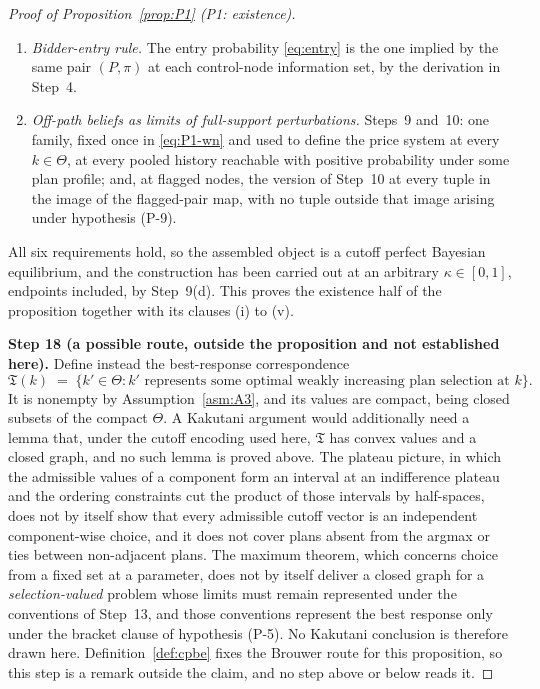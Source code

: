 \documentclass[11pt]{article}
\newcommand{\Eop}{\mathbb{E}}
\newcommand{\Tmap}{\mathcal{T}}
\begin{document}
\begin{proof}[Proof of Proposition~\ref{prop:P1} (P1: existence)]
\begin{enumerate}[label=(\roman*),leftmargin=2.4em,itemsep=3pt]
  pooled family and Step~6 for the measurable flagged family, both solving
  $P(\mathcal I) = \Eop[Y \mid \mathcal I]$ by Step~4, at the beliefs of (iii) where the history
  carries positive probability under $k^\star$, and at Step~9(b)'s limit belief at the reachable
  histories that do not, since those are the histories the deviation payoffs defining $\Tmap$ read.
  At unreachable histories the requirement asks nothing and Step~9(c)'s convention supplies a value
  that is itself an inner root.
\item \emph{Bidder-entry rule.} The entry probability \eqref{eq:entry} is the one implied by the same
  pair $(P,\pi)$ at each control-node information set, by the derivation in Step~4.
\item \emph{Off-path beliefs as limits of full-support perturbations.} Steps~9 and~10: one family,
  fixed once in \eqref{eq:P1-wn} and used to define the price system at every $k \in \Theta$, at
  every pooled history reachable with positive probability under some plan profile; and, at flagged
  nodes, the version of Step~10 at every tuple in the image of the flagged-pair map, with no tuple
  outside that image arising under hypothesis (P-9).
\end{enumerate}

All six requirements hold, so the assembled object is a cutoff perfect Bayesian equilibrium, and the
construction has been carried out at an arbitrary $\kappa \in [0,1]$, endpoints included, by
Step~9(d). This proves the existence half of the proposition together with its clauses (i) to (v).

\smallskip
\noindent\textbf{Step 18 (a possible route, outside the proposition and not established here).}
Define instead the best-response correspondence
\[
\mathfrak T(k) \;=\; \bigl\{k' \in \Theta : k' \text{ represents some optimal weakly increasing plan
selection at } k\bigr\}.
\]
It is nonempty by Assumption~\ref{asm:A3}, and its values are compact, being closed subsets of the
compact $\Theta$. A Kakutani argument would additionally need a lemma that, under the cutoff encoding
used here, $\mathfrak T$ has convex values and a closed graph, and no such lemma is proved above. The
plateau picture, in which the admissible values of a component form an interval at an indifference
plateau and the ordering constraints cut the product of those intervals by half-spaces, does not by
itself show that every admissible cutoff vector is an independent component-wise choice, and it does
not cover plans absent from the argmax or ties between non-adjacent plans. The maximum theorem, which
concerns choice from a fixed set at a parameter, does not by itself deliver a closed graph for a
\emph{selection-valued} problem whose limits must remain represented under the conventions of
Step~13, and those conventions represent the best response only under the bracket clause of
hypothesis (P-5). No Kakutani conclusion is therefore drawn here. Definition~\ref{def:cpbe} fixes the
Brouwer route for this proposition, so this step is a remark outside the claim, and no step above or
below reads it.


\end{proof}
\end{document}
